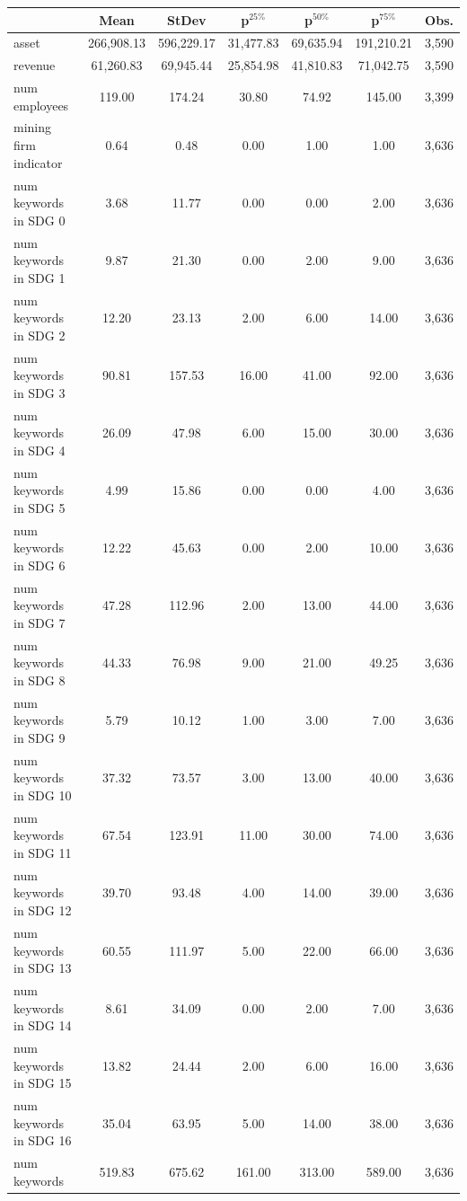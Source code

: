 
\begin{tabular}{lcccccc}
\toprule
  & Mean & StDev & p$^{25\%}$ & p$^{50\%}$ & p$^{75\%}$ & Obs.\\
\midrule
asset & 266,908.13 & 596,229.17 & 31,477.83 & 69,635.94 & 191,210.21 & 3,590\\
revenue & 61,260.83 & 69,945.44 & 25,854.98 & 41,810.83 & 71,042.75 & 3,590\\
num employees & 119.00 & 174.24 & 30.80 & 74.92 & 145.00 & 3,399\\
mining firm indicator & 0.64 & 0.48 & 0.00 & 1.00 & 1.00 & 3,636\\
num keywords in SDG 0 & 3.68 & 11.77 & 0.00 & 0.00 & 2.00 & 3,636\\
num keywords in SDG 1 & 9.87 & 21.30 & 0.00 & 2.00 & 9.00 & 3,636\\
num keywords in SDG 2 & 12.20 & 23.13 & 2.00 & 6.00 & 14.00 & 3,636\\
num keywords in SDG 3 & 90.81 & 157.53 & 16.00 & 41.00 & 92.00 & 3,636\\
num keywords in SDG 4 & 26.09 & 47.98 & 6.00 & 15.00 & 30.00 & 3,636\\
num keywords in SDG 5 & 4.99 & 15.86 & 0.00 & 0.00 & 4.00 & 3,636\\
num keywords in SDG 6 & 12.22 & 45.63 & 0.00 & 2.00 & 10.00 & 3,636\\
num keywords in SDG 7 & 47.28 & 112.96 & 2.00 & 13.00 & 44.00 & 3,636\\
num keywords in SDG 8 & 44.33 & 76.98 & 9.00 & 21.00 & 49.25 & 3,636\\
num keywords in SDG 9 & 5.79 & 10.12 & 1.00 & 3.00 & 7.00 & 3,636\\
num keywords in SDG 10 & 37.32 & 73.57 & 3.00 & 13.00 & 40.00 & 3,636\\
num keywords in SDG 11 & 67.54 & 123.91 & 11.00 & 30.00 & 74.00 & 3,636\\
num keywords in SDG 12 & 39.70 & 93.48 & 4.00 & 14.00 & 39.00 & 3,636\\
num keywords in SDG 13 & 60.55 & 111.97 & 5.00 & 22.00 & 66.00 & 3,636\\
num keywords in SDG 14 & 8.61 & 34.09 & 0.00 & 2.00 & 7.00 & 3,636\\
num keywords in SDG 15 & 13.82 & 24.44 & 2.00 & 6.00 & 16.00 & 3,636\\
num keywords in SDG 16 & 35.04 & 63.95 & 5.00 & 14.00 & 38.00 & 3,636\\
num keywords & 519.83 & 675.62 & 161.00 & 313.00 & 589.00 & 3,636\\
\bottomrule
\end{tabular}
